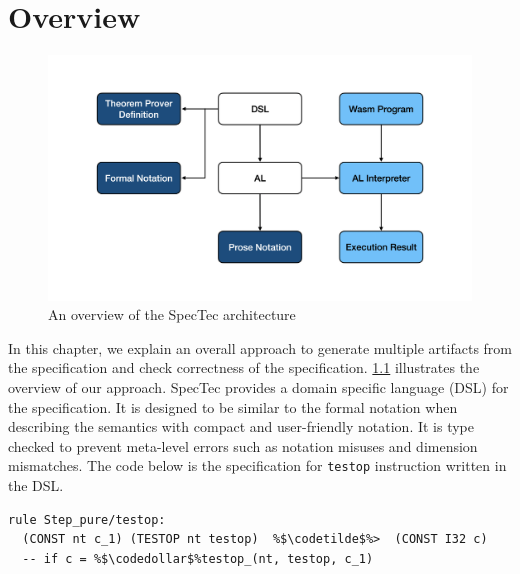 
\chapter{Overview}
\label{ch:overview}
\noindent


\begin{figure}[h]
  \centerline{\includegraphics[width=15cm]{fig/overview}}
  \caption[An overview of the SpecTec architecture]
    {An overview of the SpecTec architecture}
    \label{fig:overview}
\end{figure}

In this chapter, we explain an overall approach to generate multiple artifacts
from the specification and check correctness of the specification.
\cref{fig:overview} illustrates the overview of our approach.
SpecTec provides a domain specific language (DSL) for the specification.
It is designed to be similar to the formal notation when describing the
semantics with compact and user-friendly notation.
It is type checked to prevent meta-level errors such as notation misuses and
dimension mismatches.
The code below is the specification for \texttt{testop} instruction written in
the DSL.
\begin{lstlisting}[escapechar=\%]
  rule Step_pure/testop:
  (CONST nt c_1) (TESTOP nt testop)  %$\codetilde$%>  (CONST I32 c)
  -- if c = %$\codedollar$%testop_(nt, testop, c_1)
\end{lstlisting}
